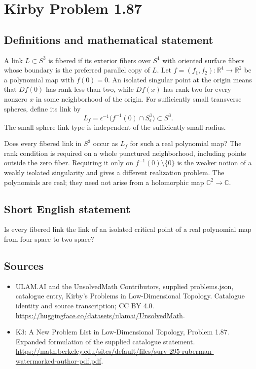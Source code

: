 \documentclass[11pt,a4paper]{article}
\begin{document}
\section*{Kirby Problem 1.87}\label{statement}

\subsection{Definitions and mathematical statement}
A link $L\subset S^3$ is fibered if its exterior fibers over $S^1$ with oriented
surface fibers whose boundary is the preferred parallel copy of $L$.
Let $f=(f_1,f_2):\mathbb R^4\to\mathbb R^2$ be a polynomial map with $f(0)=0$.
An isolated singular point at the origin means that $Df(0)$ has rank less than
two, while $Df(x)$ has rank two for every nonzero $x$ in some neighborhood of
the origin. For sufficiently small transverse spheres, define its link by
\[
L_f=\epsilon^{-1}\bigl(f^{-1}(0)\cap S^3_\epsilon\bigr)\subset S^3.
\]
The small-sphere link type is independent of the sufficiently small radius.

Does every fibered link in $S^3$ occur as $L_f$ for such a real polynomial map?
The rank condition is required on a whole punctured neighborhood, including
points outside the zero fiber. Requiring it only on
$f^{-1}(0)\setminus\{0\}$ is the weaker notion of a weakly isolated singularity
and gives a different realization problem. The polynomials are real; they need
not arise from a holomorphic map $\mathbb C^2\to\mathbb C$.
\subsection{Short English statement}
Is every fibered link the link of an isolated critical point of a real polynomial map from four-space to two-space?
\subsection{Sources}
\begin{itemize}
\item[S1] ULAM.AI and the UnsolvedMath Contributors, supplied problems.json, catalogue entry, Kirby's Problems in Low-Dimensional Topology. Catalogue identity and source transcription; CC BY 4.0.
\url{https://huggingface.co/datasets/ulamai/UnsolvedMath}.
\item[S2] K3: A New Problem List in Low-Dimensional Topology, Problem 1.87. Expanded formulation of the supplied catalogue statement.
\url{https://math.berkeley.edu/sites/default/files/surv-295-ruberman-watermarked-author-pdf.pdf}.
\end{itemize}
\end{document}
